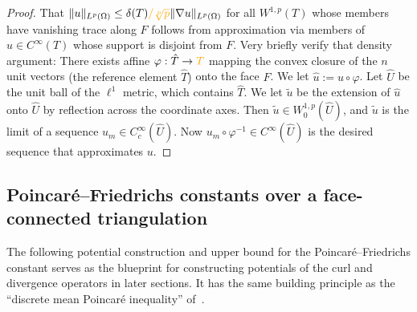 \documentclass[10pt,letterpaper]{article}
\newcommand\cye[1]{%
  \protect\leavevmode
  \begingroup
    \color{red!35!yellow}%
    #1%
  \endgroup
}
\begin{document}
\begin{proof}
    That $\|u\|_{L^{p}(\Omega)} \leq \diam(T)\cye{/\sqrt[p]{p}} \|\nabla u\|_{L^{p}(\Omega)}$ for all $W^{1,p}(T)$ whose members have vanishing trace along $F$ follows from approximation via members of $u \in C^{\infty}(T)$ whose support is disjoint from $F$. 
    Very briefly verify that density argument: 
    There exists \cye{affine} $\varphi : \hat T \rightarrow \cye{T}$ mapping the convex closure of the $n$ unit vectors \cye{(the reference element $\hat T$)} onto the face $F$.
    We let $\hat u := u \circ \varphi$.
    Let $\hat U$ be the unit ball of the $\ell^1$ metric, which contains $\hat T$.
    We let $\tilde u$ be the extension of $\hat u$ onto $\hat U$ by reflection across the coordinate axes.
    Then $\tilde u \in W^{1,p}_{0}(\hat U)$, and $\tilde u$ is the limit of a sequence $u_{m} \in C^{\infty}_{c}(\hat U)$.
    Now $u_{m} \circ \varphi^{-1} \in C^{\infty}(\hat U)$ is the desired sequence that approximates $u$. 
\end{proof}

\subsection{\cye{Poincar\'e--Friedrichs constants over a face-connected triangulation}}

The following potential construction and upper bound for the Poincar\'e--Friedrichs constant 
serves as the blueprint for constructing potentials of the curl and divergence operators in later sections. \cye{It has the same building principle as the ``discrete mean Poincar\'e inequality'' of~\cite[Lemma~3.7]{Eym_Gal_Her_00}.}

\end{document}
